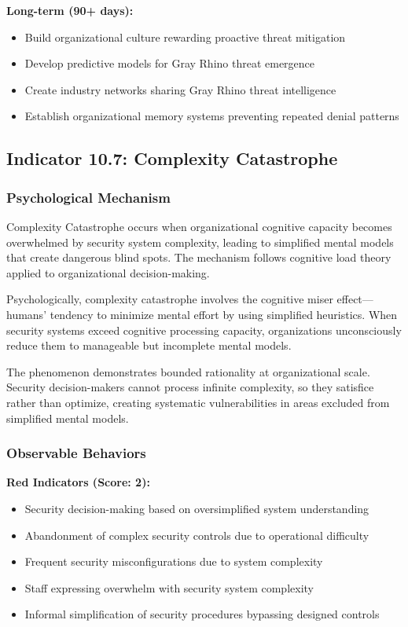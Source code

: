 \documentclass[11pt,a4paper]{article}
\begin{document}
\textbf{Long-term (90+ days):}
\begin{itemize}
\item Build organizational culture rewarding proactive threat mitigation
\item Develop predictive models for Gray Rhino threat emergence
\item Create industry networks sharing Gray Rhino threat intelligence
\item Establish organizational memory systems preventing repeated denial patterns
\end{itemize}

\subsection{Indicator 10.7: Complexity Catastrophe}

\subsubsection{Psychological Mechanism}

Complexity Catastrophe occurs when organizational cognitive capacity becomes overwhelmed by security system complexity, leading to simplified mental models that create dangerous blind spots. The mechanism follows cognitive load theory\cite{sweller1988} applied to organizational decision-making.

Psychologically, complexity catastrophe involves the cognitive miser effect—humans' tendency to minimize mental effort by using simplified heuristics. When security systems exceed cognitive processing capacity, organizations unconsciously reduce them to manageable but incomplete mental models.

The phenomenon demonstrates bounded rationality\cite{simon1972} at organizational scale. Security decision-makers cannot process infinite complexity, so they satisfice rather than optimize, creating systematic vulnerabilities in areas excluded from simplified mental models.

\subsubsection{Observable Behaviors}

\textbf{Red Indicators (Score: 2):}
\begin{itemize}
\item Security decision-making based on oversimplified system understanding
\item Abandonment of complex security controls due to operational difficulty
\item Frequent security misconfigurations due to system complexity
\item Staff expressing overwhelm with security system complexity
\item Informal simplification of security procedures bypassing designed controls
\end{itemize}
\end{document}
